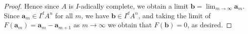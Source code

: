 \documentclass{article}
\theoremstyle{definition}
\theoremstyle{plain}
\theoremstyle{remark}
\begin{document}
\begin{proof}
		Hence since $A$ is $I$-adically complete, we obtain a limit $\mathbf{b} = \lim_{m\to \infty} \mathbf{a}_m$. Since $\mathbf{a}_m \in I^dA^n$ for all $m$, we have $\mathbf{b}\in I^dA^n$, and taking the limit of $F(\mathbf{a}_m) = \mathbf{a}_{m}-\mathbf{a}_{m+1}$ as $m\to \infty$ we obtain that $F(\mathbf{b}) = 0$, as desired.
	\end{proof}
	\printbibliography
\end{document}
